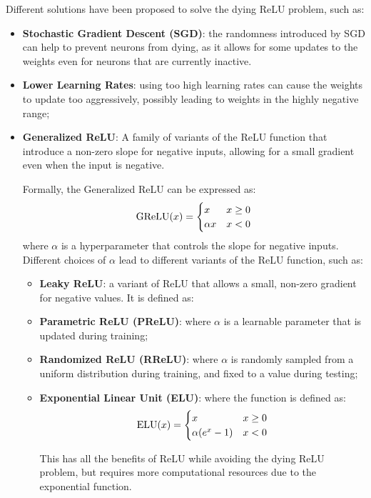 Different solutions have been proposed to solve the dying ReLU problem, such as:
\begin{itemize}
    \item \textbf{Stochastic Gradient Descent (SGD)}: the randomness introduced by SGD can help to prevent neurons from dying, 
    as it allows for some updates to the weights even for neurons that are currently inactive.
    
    \item \textbf{Lower Learning Rates}: using too high learning rates can cause the weights to update too aggressively, possibly leading to weights in the highly negative range;
    
    \item \textbf{Generalized ReLU}: A family of variants of the ReLU function that introduce a non-zero slope for negative inputs, allowing for a small gradient even when the input is negative.
    
    Formally, the Generalized ReLU can be expressed as:
    \begin{equation*}
        \operatorname{GReLU}(x) = \begin{cases} x & x \geq 0 \\ \alpha x & x < 0 \end{cases}
    \end{equation*}
    where $\alpha$ is a hyperparameter that controls the slope for negative inputs. Different choices of $\alpha$ lead to different variants of the ReLU function, such as:
    
    \begin{itemize}
        \item \textbf{Leaky ReLU}: a variant of ReLU that allows a small, non-zero gradient for negative values. It is defined as:
        \begin{figure}[H]
            \centering
            
        \end{figure}
        
        \item \textbf{Parametric ReLU (PReLU)}: where $\alpha$ is a learnable parameter that is updated during training;
        
        \item \textbf{Randomized ReLU (RReLU)}: where $\alpha$ is randomly sampled from a uniform distribution during training, and fixed to a value during testing;
        
        \item \textbf{Exponential Linear Unit (ELU)}: where the function is defined as:
        \begin{equation*}
            \operatorname{ELU}(x) = \begin{cases} x & x \geq 0 \\ \alpha (e^x - 1) & x < 0 \end{cases}
        \end{equation*}
        
        This has all the benefits of ReLU while avoiding the dying ReLU problem, but requires more computational resources due to the exponential function.
    \end{itemize}

\end{itemize}
